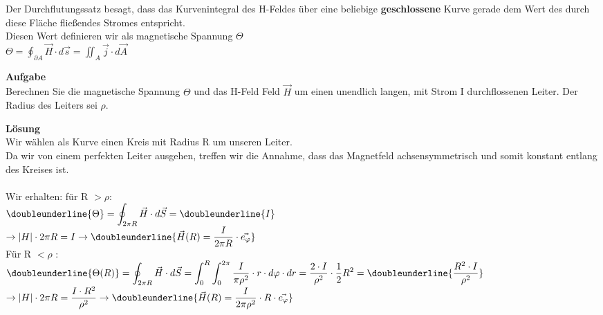 	\beginip
	Der Durchflutungssatz besagt, dass das Kurvenintegral des H-Feldes über eine beliebige \textbf{geschlossene} Kurve gerade dem Wert des durch diese Fläche fließendes Stromes entspricht. \\
	Diesen Wert definieren wir als magnetische Spannung $\Theta$ \\
	\formulaBegin
	$\displaystyle \Theta = \oint_{\partial A} \vec{H} \cdot d\vec{s} = \iint_{A} \vec{j} \cdot d\vec{A} $
	\formulaEnd
	\iend

	\beginip
	\textbf{Aufgabe} \\
	Berechnen Sie die magnetische Spannung $\Theta$ und das H-Feld Feld $\vec{H}$ um einen unendlich langen, mit Strom I durchflossenen Leiter. Der Radius des Leiters sei $\rho$. \\
	\iend

	\beginip
	\textbf{Lösung} \\

	Wir wählen als Kurve einen Kreis mit Radius R um unseren Leiter. \\
	Da wir von einem perfekten Leiter ausgehen, treffen wir die Annahme, dass das Magnetfeld achsensymmetrisch und somit konstant entlang des Kreises ist. \\
	\\
	Wir erhalten: für R $ > \rho$: \\
	$\displaystyle  \doubleunderline{\Theta} =  \oint_{2\pi R} \vec{H} \cdot d\vec{S} = \doubleunderline{I} $ \\
	$ \displaystyle \rightarrow |H| \cdot 2 \pi R = I \rightarrow \doubleunderline{\vec{H}(R) = \frac{I}{2 \pi R} \cdot \vec{e_{\varphi}}} $\\

	Für R $ < \rho $ : \\
	$\displaystyle  \doubleunderline{\Theta(R)} =  \oint_{2\pi R} \vec{H} \cdot d\vec{S} =\int_{0}^{R} \int_{0}^{2\pi} \frac{I}{\pi{\rho}^2} \cdot r \cdot d\varphi  \cdot dr  = \frac{2 \cdot I}{\rho^2} \cdot \frac{1}{2} R^2 =  \doubleunderline{\frac{R^2\cdot I}{\rho^2}} 		  $ \\
	$ \displaystyle \rightarrow |H| \cdot 2 \pi R = \frac{I \cdot R^2}{\rho^2} \rightarrow \doubleunderline{\vec{H}(R) = \frac{I}{2\pi \rho^2} \cdot R \cdot \vec{e_{\varphi}}} $


